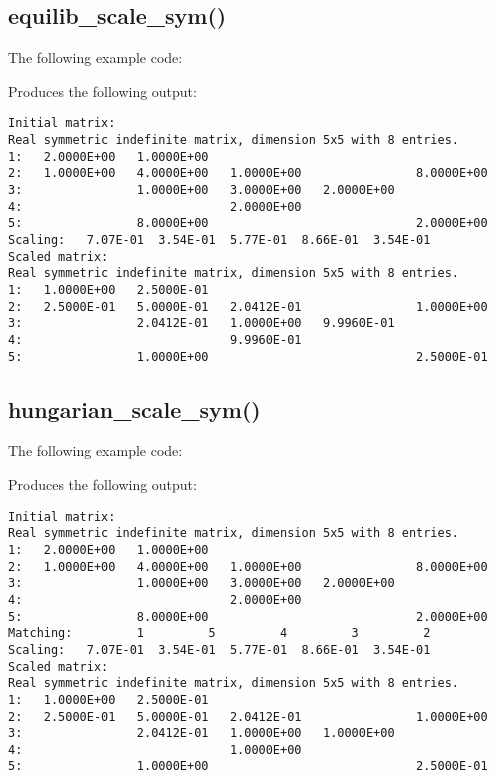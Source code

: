 \subsection{equilib\_scale\_sym()}
The following example code:

Produces the following output:
\begin{verbatim}
Initial matrix:
Real symmetric indefinite matrix, dimension 5x5 with 8 entries.
1:   2.0000E+00   1.0000E+00                                       
2:   1.0000E+00   4.0000E+00   1.0000E+00                8.0000E+00
3:                1.0000E+00   3.0000E+00   2.0000E+00             
4:                             2.0000E+00                          
5:                8.0000E+00                             2.0000E+00
Scaling:   7.07E-01  3.54E-01  5.77E-01  8.66E-01  3.54E-01
Scaled matrix:
Real symmetric indefinite matrix, dimension 5x5 with 8 entries.
1:   1.0000E+00   2.5000E-01                                       
2:   2.5000E-01   5.0000E-01   2.0412E-01                1.0000E+00
3:                2.0412E-01   1.0000E+00   9.9960E-01             
4:                             9.9960E-01                          
5:                1.0000E+00                             2.5000E-01
\end{verbatim}

\subsection{hungarian\_scale\_sym()}
The following example code:

Produces the following output:
\begin{verbatim}
Initial matrix:
Real symmetric indefinite matrix, dimension 5x5 with 8 entries.
1:   2.0000E+00   1.0000E+00                                       
2:   1.0000E+00   4.0000E+00   1.0000E+00                8.0000E+00
3:                1.0000E+00   3.0000E+00   2.0000E+00             
4:                             2.0000E+00                          
5:                8.0000E+00                             2.0000E+00
Matching:         1         5         4         3         2
Scaling:   7.07E-01  3.54E-01  5.77E-01  8.66E-01  3.54E-01
Scaled matrix:
Real symmetric indefinite matrix, dimension 5x5 with 8 entries.
1:   1.0000E+00   2.5000E-01                                       
2:   2.5000E-01   5.0000E-01   2.0412E-01                1.0000E+00
3:                2.0412E-01   1.0000E+00   1.0000E+00             
4:                             1.0000E+00                          
5:                1.0000E+00                             2.5000E-01
\end{verbatim}
